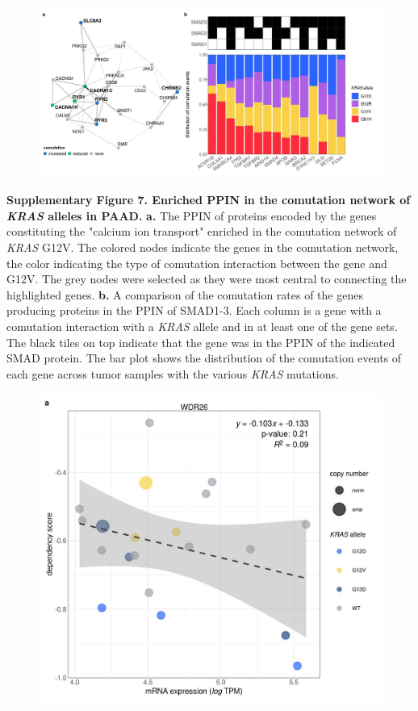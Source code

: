 \documentclass[english, 10pt, letterpaper]{article}
\newcommand{\KRAS}{\emph{KRAS}}
\begin{document}
\begin{figure}[h!]
\centering
\includegraphics[width=180mm]{figures/Supp_Fig_7.jpeg}
\label{sfig:paad-comutation-supp}
\end{figure}

\noindent \textbf{Supplementary Figure 7. Enriched PPIN in the comutation network of \KRAS{} alleles in PAAD.}
\textbf{a.} The PPIN of proteins encoded by the genes constituting the "calcium ion transport" enriched in the comutation network of \KRAS{} G12V. The colored nodes indicate the genes in the comutation network, the color indicating the type of comutation interaction between the gene and G12V. The grey nodes were selected as they were most central to connecting the highlighted genes.
\textbf{b.} A comparison of the comutation rates of the genes producing proteins in the PPIN of SMAD1-3. Each column is a gene with a comutation interaction with a \KRAS{} allele and in at least one of the gene sets. The black tiles on top indicate that the gene was in the PPIN of the indicated SMAD protein. The bar plot shows the distribution of the comutation events of each gene across tumor samples with the various \KRAS{} mutations.
\newpage


\begin{figure}[h!]
\centering
\includegraphics[width=180mm]{figures/Supp_Fig_8.jpeg}
\label{sfig:coad-dep-wdr26}
\end{figure}
\end{document}
